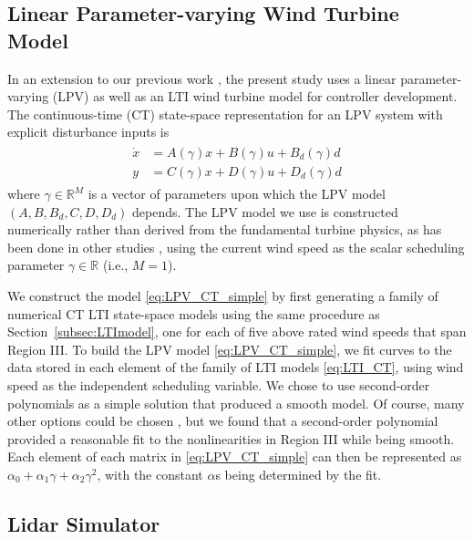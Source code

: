 \documentclass[letterpaper, 10 pt, conference]{ieeeconf}  %
\begin{document}
\subsection{Linear Parameter-varying Wind Turbine Model}

In an extension to our previous work \cite{Sinner2018}, the present study uses a linear parameter-varying (LPV) as well as an LTI wind turbine model for controller development. The continuous-time (CT) state-space representation for an LPV system with explicit disturbance inputs is
\begin{align}\label{eq:LPV_CT_simple}
\begin{split}
\dot{x} &= A(\gamma)x + B(\gamma)u + B_d(\gamma)d \\
y &= C(\gamma)x + D(\gamma)u + D_d(\gamma)d
\end{split}
\end{align}
where $\gamma \in \mathbb{R}^M$ is a vector of parameters upon which the LPV model $(A,B,B_d,C,D,D_d)$ depends. The LPV model we use is constructed numerically rather than derived from the fundamental turbine physics, as has been done in other studies \cite{Mirzaei2016}\cite{Soltani2011}\cite{Bottasso2014}, using the current wind speed as the scalar scheduling parameter $\gamma \in \mathbb{R}$ (i.e., $M=1$).

We construct the model \eqref{eq:LPV_CT_simple} by first generating a family of numerical CT LTI state-space models using the same procedure as Section~\ref{subsec:LTImodel}, one for each of five above rated wind speeds that span Region III. To build the LPV model \eqref{eq:LPV_CT_simple}, we fit curves to the data stored in each element of the family of LTI models \eqref{eq:LTI_CT}, using wind speed as the independent scheduling variable. We chose to use second-order polynomials as a simple solution that produced a smooth model. Of course, many other options could be chosen \cite{Ossmann2017}, but we found that a second-order polynomial provided a reasonable fit to the nonlinearities in Region III while being smooth. Each element of each matrix in \eqref{eq:LPV_CT_simple} can then be represented as $\alpha_0 + \alpha_1 \gamma + \alpha_2 \gamma^2$, with the constant $\alpha$s being determined by the fit.

\subsection{Lidar Simulator}
\end{document}

